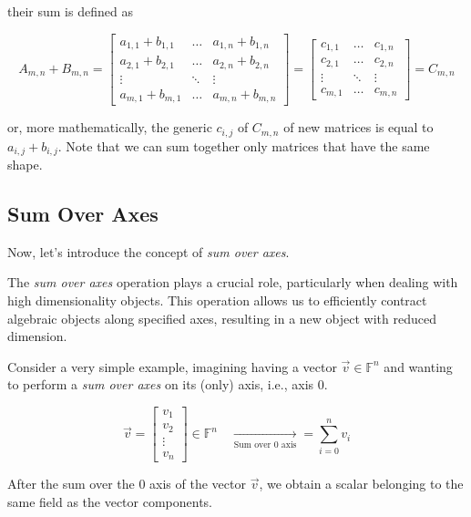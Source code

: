 their sum is defined as

\[
A_{m,n} + B_{m,n} =
\begin{bmatrix}
    a_{1,1} + b_{1,1} & \dots & a_{1,n} + b_{1,n} \\
    a_{2,1} + b_{2,1} & \dots & a_{2,n} + b_{2,n} \\
    \vdots & \ddots & \vdots \\
    a_{m,1} + b_{m,1} & \dots & a_{m,n} + b_{m,n}
\end{bmatrix}
=
\begin{bmatrix}
    c_{1,1} & \dots & c_{1,n} \\
    c_{2,1} & \dots & c_{2,n} \\
    \vdots & \ddots & \vdots \\
    c_{m,1} & \dots & c_{m,n}
\end{bmatrix}
= C_{m,n}
\]

or, more mathematically, the generic $c_{i,j}$ of $C_{m,n}$ of new matrices is equal to $a_{i,j} + b_{i,j}$.
Note that we can sum together only matrices that have the same shape.
\\

\subsection{Sum Over Axes}\label{subsection:sum-over-axes}
Now, let's introduce the concept of \textit{sum over axes}.

The \textit{sum over axes} operation plays a crucial role, particularly when dealing with high dimensionality objects. This operation allows us to efficiently contract algebraic objects along specified axes, resulting in a new object with reduced dimension.

Consider a very simple example, imagining having a vector $\vec{v} \in \mathbb{F}^n$ and wanting to perform a \textit{sum over axes} on its (only) axis, i.e., axis 0.

$$
\vec{v} = \begin{bmatrix}
    v_1 \\
    v_2 \\
    \vdots\\
    v_n
\end{bmatrix} \in \mathbb{F}^n \quad \underset{\text{Sum over 0 axis}}{\longrightarrow} = \sum_{i=0}^n v_i
$$

After the sum over the 0 axis of the vector $\vec{v}$, we obtain a scalar belonging to the same field as the vector components. 
\\

